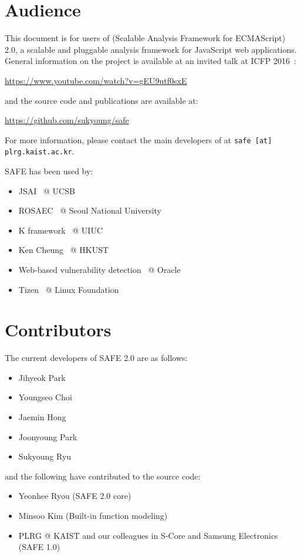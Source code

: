 \section{Audience}
This document is for users of \safe (Scalable Analysis Framework for ECMAScript)
2.0, a scalable and pluggable analysis framework for JavaScript web applications.
General information on the \safe project is available at an invited talk at ICFP 2016~\cite{safeicfp16}:
\begin{center}
  \url{https://www.youtube.com/watch?v=gEU9utf0sxE}
\end{center}
and the source code and publications are available at:
\begin{center}
  \url{https://github.com/sukyoung/safe}
\end{center}
For more information, please contact the main developers of \safe
at \texttt{safe [at] plrg.kaist.ac.kr}.

SAFE has been used by:
\begin{itemize}
\itemsep-.2em
\item JSAI~\cite{jsai} @ UCSB
\item ROSAEC~\cite{rosaec} @ Seoul National University
\item K framework~\cite{kjs} @ UIUC
\item Ken Cheung~\cite{emse16} @ HKUST
\item Web-based vulnerability detection~\cite{oracle} @ Oracle
\item Tizen~\cite{tizen} @ Linux Foundation
\end{itemize}

\section{Contributors}
The current developers of SAFE 2.0 are as follows:
\begin{itemize}
\itemsep-.2em
\item Jihyeok Park
\item Youngseo Choi
\item Jaemin Hong
\item Joonyoung Park
\item Sukyoung Ryu
\end{itemize}
and the following have contributed to the source code:
\begin{itemize}
\itemsep-.1em
\item Yeonhee Ryou (SAFE 2.0 core)
\item Minsoo Kim (Built-in function modeling)
\item PLRG @ KAIST and our colleagues in S-Core and Samsung Electronics (SAFE 1.0)
\end{itemize}


